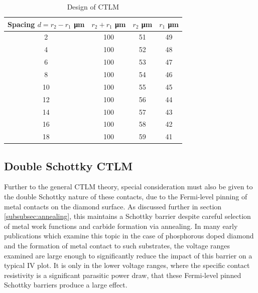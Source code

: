 \begin{refsection}
\begin{table}[H]
\centering
\begin{tabular}{cccc}
\hline
Spacing $d = r_2 - r_1$ \si{\micro\metre} & $r_2 + r_1$ \si{\micro\metre} & $r_2$ \si{\micro\metre} & $r_1$ \si{\micro\metre} \\
\hline
2 & 100 & 51 & 49 \\
4 & 100 & 52 & 48 \\
6 & 100 & 53 & 47 \\
8 & 100 & 54 & 46 \\
10 & 100 & 55 & 45 \\
12 & 100 & 56 & 44 \\
14 & 100 & 57 & 43 \\
16 & 100 & 58 & 42 \\
18 & 100 & 59 & 41 \\
\hline
\end{tabular}
\caption{Design of CTLM}
\label{tab:ref_design_ctlm}
\end{table}

\subsection{Double Schottky CTLM}
Further to the general CTLM theory, special consideration must also be given to the double Schottky nature of these contacts, due to the Fermi-level pinning of metal contacts on the diamond surface. As discussed further in section \ref{subsubsec:annealing}, this maintains a Schottky barrier despite careful selection of metal work functions and carbide formation via annealing. In many early publications which examine this topic in the case of phosphorous doped diamond and the formation of metal contact to such substrates, the voltage ranges examined are large enough to significantly reduce the impact of this barrier on a typical IV plot. It is only in the lower voltage ranges, where the specific contact resistivity is a significant parasitic power draw, that these Fermi-level pinned Schottky barriers produce a large effect. 


\end{refsection}
